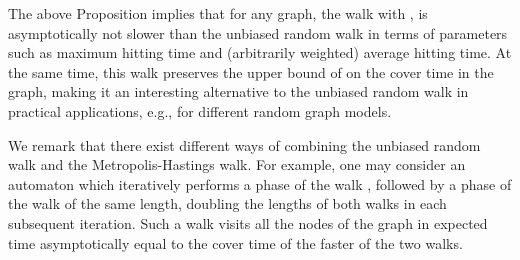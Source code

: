 \documentclass[11pt,a4paper]{article}
\renewcommand{\*}{\hspace*{5mm}}
\begin{document}
The above Proposition implies that for any graph, the walk  with , is asymptotically not slower than the unbiased random walk in terms of parameters such as maximum hitting time and (arbitrarily weighted) average hitting time. At the same time, this walk preserves the upper bound of  on the cover time in the graph, making it an interesting alternative to the unbiased random walk in practical applications, e.g., for different random graph models.

We remark that there exist different ways of combining the unbiased random walk and the Metropolis-Hastings walk. For example, one may consider an automaton which iteratively performs a phase of the walk , followed by a phase of the walk  of the same length, doubling the lengths of both walks in each subsequent iteration. Such a walk visits all the nodes of the graph in expected time asymptotically equal to the cover time of the faster of the two walks.
\end{document}
